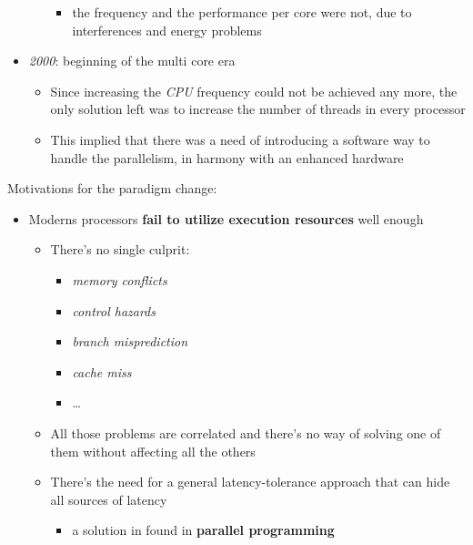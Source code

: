 \documentclass[english]{article}
\begin{document}
\begin{itemize}
\begin{itemize}
\begin{itemize}
                  \item the frequency and the performance per core were not, due to interferences and energy problems
                \end{itemize}
        \end{itemize}
  \item \textit{2000}: beginning of the multi core era
        \begin{itemize}
          \item Since increasing the \textit{CPU} frequency could not be achieved any more, the only solution left was to increase the number of threads in every processor
          \item This implied that there was a need of introducing a software way to handle the parallelism, in harmony with an enhanced hardware
        \end{itemize}
\end{itemize}

\bigskip
Motivations for the paradigm change:

\begin{itemize}
  \item Moderns processors \textbf{fail to utilize execution resources} well enough
        \begin{itemize}
          \item There's no single culprit:
                \begin{itemize}[label=\xmark]
                  \item \textit{memory conflicts}
                  \item \textit{control hazards}
                  \item \textit{branch misprediction}
                  \item \textit{cache miss}
                  \item \ldots
                \end{itemize}
          \item All those problems are correlated and there's no way of solving one of them without affecting all the others
          \item There's the need for a general latency-tolerance approach that can hide all sources of latency
                \begin{itemize}[label=\cmark]
                  \item a solution in found in \textbf{parallel programming}
                \end{itemize}
        \end{itemize}
\end{itemize}
\end{document}
